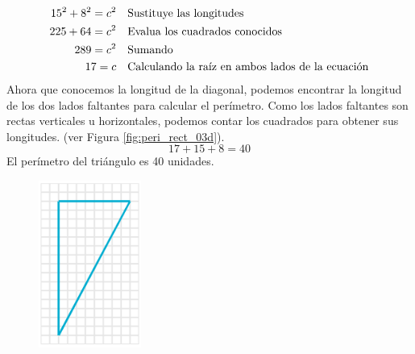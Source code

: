\begin{solutionbox}{16cm}
\begin{minipage}{0.55\textwidth}
\begin{align*}
            15^2+8^2  =c^2 & \text{\quad Sustituye las longitudes}                         \\
            225 +64 =c^2    & \text{\quad Evalua los cuadrados conocidos}                   \\
            289=c^2        & \text{\quad Sumando }                                         \\
            17=c           & \text{\quad Calculando la raíz en ambos lados de la ecuación} \\
        \end{align*}
        Ahora que conocemos la longitud de la diagonal, podemos encontrar la longitud de los dos lados faltantes para calcular el perímetro.
        Como los lados faltantes son rectas verticales u horizontales, podemos contar los cuadrados para obtener sus longitudes. (ver Figura \ref{fig:peri_rect_03d}).
        \[17+15+8=40\]
        El perímetro del triángulo es 40 unidades.
    \end{minipage}
\end{solutionbox}
\begin{figure}[H]
    \begin{center}
        \includegraphics[width=0.3\textwidth]{../images/peri_rect_03.png}
    \end{center}
    \caption{}
    \label{fig:peri_rect_03}
\end{figure}